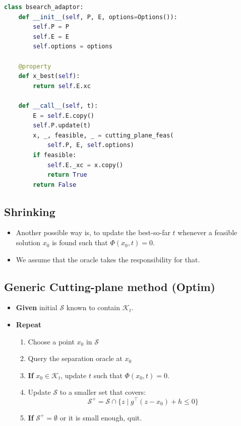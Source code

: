 \documentclass[]{article}
\providecommand{\tightlist}{%
  \setlength{\itemsep}{0pt}\setlength{\parskip}{0pt}}
\begin{document}
\begin{lstlisting}[language=Python]
class bsearch_adaptor:
    def __init__(self, P, E, options=Options()):
        self.P = P
        self.E = E
        self.options = options

    @property
    def x_best(self):
        return self.E.xc

    def __call__(self, t):
        E = self.E.copy()
        self.P.update(t)
        x, _, feasible, _ = cutting_plane_feas(
            self.P, E, self.options)
        if feasible:
            self.E._xc = x.copy()
            return True
        return False
\end{lstlisting}

\hypertarget{shrinking}{%
\subsection{Shrinking}\label{shrinking}}

\begin{itemize}
\tightlist
\item
  Another possible way is, to update the best-so-far \(t\) whenever a
  feasible solution \(x_0\) is found such that \(\Phi(x_0, t) = 0\).
\item
  We assume that the oracle takes the responsibility for that.
\end{itemize}

\hypertarget{generic-cutting-plane-method-optim}{%
\subsection{Generic Cutting-plane method
(Optim)}\label{generic-cutting-plane-method-optim}}

\begin{itemize}
\tightlist
\item
  \textbf{Given} initial \(\mathcal{S}\) known to contain
  \(\mathcal{K}_t\).
\item
  \textbf{Repeat}

  \begin{enumerate}
  \def\labelenumi{\arabic{enumi}.}
  \tightlist
  \item
    Choose a point \(x_0\) in \(\mathcal{S}\)
  \item
    Query the separation oracle at \(x_0\)
  \item
    \textbf{If} \(x_0 \in \mathcal{K}_t\), update \(t\) such that
    \(\Phi(x_0, t) = 0\).
  \item
    Update \(\mathcal{S}\) to a smaller set that covers:
    \[\mathcal{S}^+ = \mathcal{S} \cap \{z \mid g^\top (z - x_0) + h \leq 0\} \]
  \item
    \textbf{If} \(\mathcal{S}^+ = \emptyset\) or it is small enough,
    quit.
  \end{enumerate}
\end{itemize}
\end{document}
